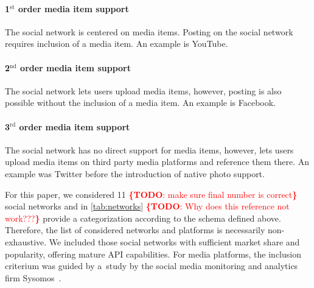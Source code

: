 \documentclass{acm_proc_article-sp}
\newcommand{\todo}[1]{\noindent\textcolor{red}{{\bf \{TODO}: #1{\bf \}}}}
\newcommand{\superscript}[1]{\ensuremath{^{\textrm{#1}}}}
\newcommand{\st}[0]{\superscript{st}}
\newcommand{\nd}[0]{\superscript{nd}}
\newcommand{\rd}[0]{\superscript{rd}}
\begin{document}

\paragraph{1{\st} order media item support}
The social network is centered on media items.
Posting on the social network requires inclusion of a media item.
An example is YouTube.

\paragraph{2{\nd} order media item support}
The social network lets users upload media items, however,
posting is also possible without the inclusion of a media item.
An example is Facebook.

\paragraph{3{\rd} order media item support}
The social network has no direct support for media items, however,
lets users upload media items on third party media platforms and reference them there.
An example was Twitter before the introduction of native photo support.

For this paper, we considered 11 \todo{make sure final number is correct} social networks and in \autoref{tab:networks} \todo{Why does this reference not work???} provide a categorization according to the schema defined above.
Therefore, the list of considered networks and platforms is necessarily non-exhaustive.
We included those social networks with sufficient market share and popularity, offering mature API capabilities.
For media platforms, the inclusion criterium was guided by a~study by the social media monitoring and analytics firm Sysomos~\cite{Sysomos2011}.
\end{document}

